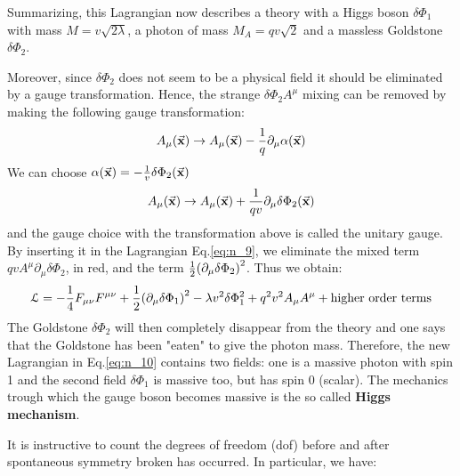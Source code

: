\documentclass[../main/main.tex]{subfiles}
\begin{document}
Summarizing, this Lagrangian now describes a theory with a Higgs boson \( \delta \Phi _1 \) with mass \( M= v \sqrt{2 \lambda }  \), a photon of mass \( M_A = qv \sqrt{2}  \) and a massless Goldstone \( \delta \Phi _2 \).


Moreover, since \( \delta \Phi _2 \) does not seem to be a physical field it should be eliminated by a gauge transformation. Hence, the strange \( \delta \Phi _2 A^\mu  \) mixing can be removed by making the following gauge transformation:
\begin{equation*}
  A _ \mu (\va{x}) \rightarrow A _ \mu (\va{x}) - \frac{1}{q} \partial_ \mu \alpha (\va{x})
\end{equation*}
We can choose \( \alpha (\va{x}) = - \frac{1}{v} \delta \Phi _2 (\va{x}) \)
\begin{equation*}
  A _ \mu (\va{x}) \rightarrow A _ \mu (\va{x}) + \frac{1}{qv} \partial_ \mu \delta \Phi _2 (\va{x})
\end{equation*}
and the gauge choice with the transformation above is called the unitary gauge.
By inserting it in the Lagrangian Eq.\eqref{eq:n_9}, we eliminate the mixed term \( q v A ^ \mu  \partial_ \mu  \delta \Phi _2  \), in red, and the term \( \frac{1}{2} \qty(\partial _ \mu  \delta \Phi _2 )^2  \). Thus we obtain:
\begin{equation}
  \mathcal{L} = - \frac{1}{4} F _{\mu \nu } F ^ {\mu \nu } + \frac{1}{2} \qty(\partial _ \mu  \delta \Phi _1 )^2 - \lambda v^2 \delta \Phi _1^2
  + q^2 v^2 A_ \mu A ^ \mu  + \text{higher order terms}
  \label{eq:n_10}
\end{equation}
The Goldstone \( \delta \Phi _2 \)  will then completely disappear from the theory and one says that the Goldstone has been "eaten" to give the photon mass.
Therefore, the new Lagrangian in Eq.\eqref{eq:n_10} contains two fields: one is a massive photon with spin 1 and the second field \( \delta \Phi _1 \) is massive too, but has spin 0 (scalar).
The mechanics trough which the gauge boson becomes massive is the so called \textbf{Higgs mechanism}.

It is instructive to count the degrees of freedom (dof) before and after spontaneous symmetry broken has occurred. In particular, we have:
\end{document}
